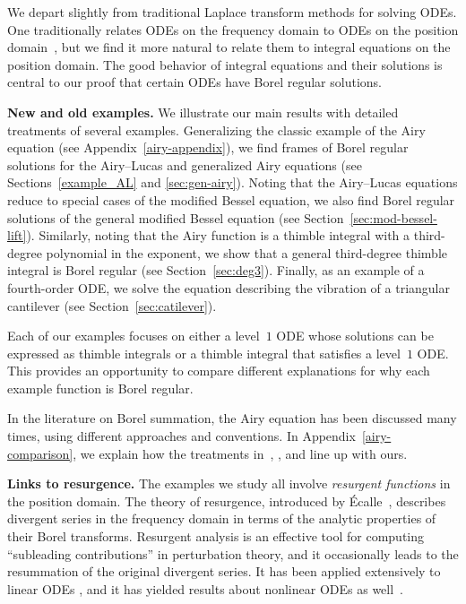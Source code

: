 \documentclass[10pt,a4paper]{amsart}
\numberwithin{equation}{section}
\begin{document}
We depart slightly from traditional Laplace transform methods for solving ODEs. One traditionally relates ODEs on the frequency domain to ODEs on the position domain~\cite{braaksma2006laplace,laplace-tfm}, but we find it more natural to relate them to integral equations on the position domain. The good behavior of integral equations and their solutions is central to our proof that certain ODEs have Borel regular solutions.

{\bf New and old examples.}
%
We illustrate our main results with detailed treatments of several examples. Generalizing the classic example of the Airy equation (see Appendix~\ref{airy-appendix}), we find frames of Borel regular solutions for the Airy--Lucas and generalized Airy equations (see Sections~\ref{example_AL} and \ref{sec:gen-airy}). Noting that the Airy--Lucas equations reduce to special cases of the modified Bessel equation, we also find Borel regular solutions of the general modified Bessel equation (see Section~\ref{sec:mod-bessel-lift}). Similarly, noting that the Airy function is a thimble integral with a third-degree polynomial in the exponent, we show that a general third-degree thimble integral is Borel regular (see Section~\ref{sec:deg3}). Finally, as an example of a fourth-order ODE, we solve the equation describing the vibration of a triangular cantilever (see Section~\ref{sec:catilever}).

Each of our examples focuses on either a level~$1$ ODE whose solutions can be expressed as thimble integrals or a thimble integral that satisfies a level~$1$ ODE. This provides an opportunity to compare different explanations for why each example function is Borel regular.

In the literature on Borel summation, the Airy equation has been discussed many times, using different approaches and conventions. In Appendix~\ref{airy-comparison}, we explain how the treatments in~\cite[Section 2.2]{lectures-Marino}, \cite[Section 6.14]{diverg-resurg-i}, and \cite[Section 2.2]{kawai-takei} line up with ours.

{\bf Links to resurgence.}
%
The examples we study all involve {\em resurgent functions} in the position domain. The theory of resurgence, introduced by \'Ecalle~\cite{EcalleI,EcalleII,EcalleIII}, describes divergent series in the frequency domain in terms of the analytic properties of their Borel transforms. Resurgent analysis is an effective tool for computing ``subleading contributions'' in perturbation theory, and it occasionally leads to the resummation of the original divergent series. It has been applied extensively to linear ODEs \cite{loday1994stokes,diverg-resurg--ii}, and it has yielded results about nonlinear ODEs as well~\cite{schiappa-PI,costin-PI,costin_kruskal,diverg-resurg-iii}.
\end{document}
